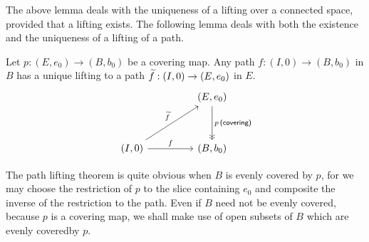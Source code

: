 The above lemma deals with the uniqueness of a lifting over a connected space, provided that a lifting exists.
The following lemma deals with both the existence and the uniqueness of a lifting of a path.
\begin{lem}
    Let $p: (E, e_0)\rightarrow (B, b_0)$ be a covering map.
    Any path $f: (I, 0)\rightarrow (B, b_0)$ in $B$ has a unique lifting to a path $\widetilde{f}: (I, 0)\rightarrow (E, e_0)$ in $E$.
    \begin{equation*}
    \begin{tikzcd}[row sep=1.2cm, column sep=1.6cm]
        &
        (E, e_0)
        \arrow[d, "p\,\textsf{(covering)}", ->>]
        \\
        (I, 0)
        \arrow[ur, "\wt{f}"]
        \arrow[r, "f"]
        &
        (B, b_0)
    \end{tikzcd}
    \end{equation*}
\end{lem}
\begin{rmk}
    The path lifting theorem is quite obvious when $B$ is evenly covered by $p$, for we may choose the restriction of $p$ to the slice containing $e_0$ and composite the inverse of the restriction to the path.
    Even if $B$ need not be evenly covered, because $p$ is a covering map, we shall make use of open subsets of $B$ which are evenly coveredby $p$.
\end{rmk}
